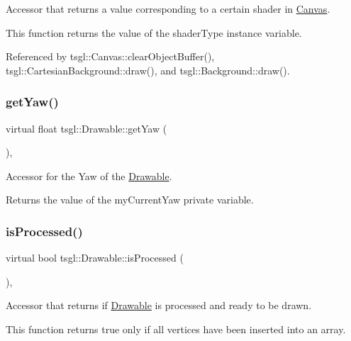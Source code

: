 Accessor that returns a value corresponding to a certain shader in \hyperlink{classtsgl_1_1_canvas}{Canvas}. 

This function returns the value of the shader\+Type instance variable. 

Referenced by tsgl\+::\+Canvas\+::clear\+Object\+Buffer(), tsgl\+::\+Cartesian\+Background\+::draw(), and tsgl\+::\+Background\+::draw().

\mbox{\label{classtsgl_1_1_drawable_a9560ac32d0e19ee79b163c17f163cbb9}} 
\subsubsection{\texorpdfstring{get\+Yaw()}{getYaw()}}
{\footnotesize\ttfamily virtual float tsgl\+::\+Drawable\+::get\+Yaw (\begin{DoxyParamCaption}{ }\end{DoxyParamCaption})\hspace{0.3cm}{\ttfamily [inline]}, {\ttfamily [virtual]}}



Accessor for the Yaw of the \hyperlink{classtsgl_1_1_drawable}{Drawable}. 

Returns the value of the my\+Current\+Yaw private variable. \mbox{\label{classtsgl_1_1_drawable_a98562ec95c8621ba9b46d7bd0c0ffece}} 
\subsubsection{\texorpdfstring{is\+Processed()}{isProcessed()}}
{\footnotesize\ttfamily virtual bool tsgl\+::\+Drawable\+::is\+Processed (\begin{DoxyParamCaption}{ }\end{DoxyParamCaption})\hspace{0.3cm}{\ttfamily [inline]}, {\ttfamily [virtual]}}



Accessor that returns if \hyperlink{classtsgl_1_1_drawable}{Drawable} is processed and ready to be drawn. 

This function returns true only if all vertices have been inserted into an array. 

